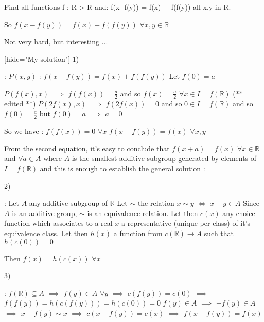 \begin{solution}
	\begin{tcolorbox}Find all functions f : R-> R and:
f(x -f(y)) = f(x) + f(f(y)) all x,y in R.\end{tcolorbox}

So $ f(x - f(y)) = f(x) + f(f(y))$ $ \forall x,y\in\mathbb R$

Not very hard, but interesting ...

[hide="My solution"]
1) :
$ P(x,y)$ : $ f(x - f(y)) = f(x) + f(f(y))$
Let $ f(0) = a$

$ P(f(x),x)$ $ \implies$ $ f(f(x)) = \frac a2$ and so $ f(x) = \frac a2$ $ \forall x\in I = f(\mathbb R)$  (** edited **)
$ P(2f(x),x)$ $ \implies$ $ f(2f(x)) = 0$ and so $ 0\in I = f(\mathbb R)$ and so $ f(0) = \frac a2$ but $ f(0) = a$ $ \implies$ $ a = 0$

So we have : 
$ f(f(x)) = 0$ $ \forall x$
$ f(x - f(y)) = f(x)$ $ \forall x,y$

From the second equation, it's easy to conclude that $ f(x + a) = f(x)$ $ \forall x\in\mathbb R$ and $ \forall a\in A$ where $ A$ is the smallest additive subgroup generated by elements of $ I = f(\mathbb R)$ and this is enough to establish the general solution :

2) :
Let $ A$ any additive subgroup of $ \mathbb R$
Let $ \sim$ the relation $ x\sim y$ $ \iff$ $ x - y\in A$
Since $ A$ is an additive group, $ \sim$ is an equivalence relation. Let then $ c(x)$ any choice function which associates to a real $ x$ a representative (unique per class) of it's equivalence class.
Let then $ h(x)$ a function from $ c(\mathbb R)\to A$ such that $ h(c(0)) = 0$

Then $ f(x) = h(c(x))$ $ \forall x$

3) :
$ f(\mathbb R)\subseteq A$ $ \implies$ $ f(y)\in A$ $ \forall y$ $ \implies$ $ c(f(y)) = c(0)$ $ \implies$ $ f(f(y)) = h(c(f(y))) = h(c(0)) = 0$
$ f(y)\in A$ $ \implies$ $ - f(y)\in A$ $ \implies$ $ x - f(y)\sim x$ $ \implies$ $ c(x - f(y)) = c(x)$ $ \implies$ $ f(x - f(y)) = f(x)$


\end{solution}

